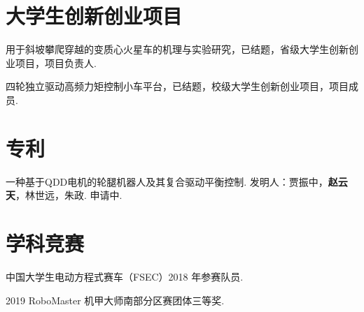 \documentclass[AutoFakeBold,AutoFakeSlant,language=chinese,degree=bachelor,zihao=-4]{sustechthesis}
\begin{document}
\section*{大学生创新创业项目}

\begin{achievements}
  \item 用于斜坡攀爬穿越的变质心火星车的机理与实验研究，已结题，省级大学生创新创业项目，项目负责人.
  \item 四轮独立驱动高频力矩控制小车平台，已结题，校级大学生创新创业项目，项目成员.
\end{achievements}
  
 \section*{专利}

\begin{achievements}
  \item 一种基于QDD电机的轮腿机器人及其复合驱动平衡控制. 发明人：贾振中，\textbf{赵云天}，林世远，朱政. 申请中.
\end{achievements}

 \section*{学科竞赛}

\begin{achievements}
  \item 中国大学生电动方程式赛车（FSEC）2018 年参赛队员.
  \item 2019 RoboMaster 机甲大师南部分区赛团体三等奖.
\end{achievements}
\end{document}

